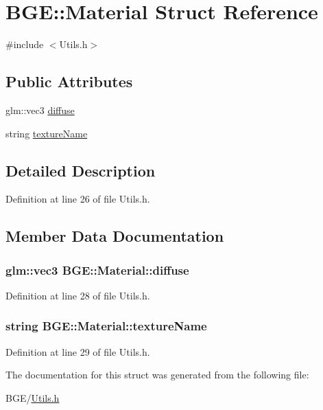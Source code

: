 \hypertarget{struct_b_g_e_1_1_material}{\section{B\-G\-E\-:\-:Material Struct Reference}
\label{struct_b_g_e_1_1_material}
}


{\ttfamily \#include $<$Utils.\-h$>$}

\subsection*{Public Attributes}
\begin{DoxyCompactItemize}
\item 
glm\-::vec3 \hyperlink{struct_b_g_e_1_1_material_ad735439554eb387237799e61e8711c40}{diffuse}
\item 
string \hyperlink{struct_b_g_e_1_1_material_a63bafc781972a1337fa925fd5137a7e4}{texture\-Name}
\end{DoxyCompactItemize}


\subsection{Detailed Description}


Definition at line 26 of file Utils.\-h.



\subsection{Member Data Documentation}
\hypertarget{struct_b_g_e_1_1_material_ad735439554eb387237799e61e8711c40}{
\subsubsection[{diffuse}]{\setlength{\rightskip}{0pt plus 5cm}glm\-::vec3 B\-G\-E\-::\-Material\-::diffuse}}\label{struct_b_g_e_1_1_material_ad735439554eb387237799e61e8711c40}


Definition at line 28 of file Utils.\-h.

\hypertarget{struct_b_g_e_1_1_material_a63bafc781972a1337fa925fd5137a7e4}{
\subsubsection[{texture\-Name}]{\setlength{\rightskip}{0pt plus 5cm}string B\-G\-E\-::\-Material\-::texture\-Name}}\label{struct_b_g_e_1_1_material_a63bafc781972a1337fa925fd5137a7e4}


Definition at line 29 of file Utils.\-h.



The documentation for this struct was generated from the following file\-:\begin{DoxyCompactItemize}
\item 
B\-G\-E/\hyperlink{_utils_8h}{Utils.\-h}\end{DoxyCompactItemize}
